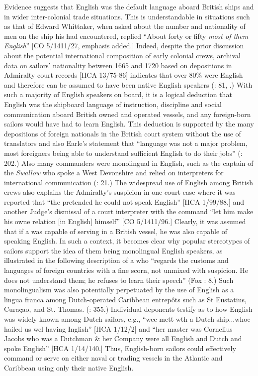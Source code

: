   Evidence suggests that English was the default language aboard British ships and in wider inter-colonial trade situations. This is understandable in situations such as that of Edward Whittaker, when asked about the number and nationality of men on the ship his  had encountered, replied “About forty or fifty \textit{most of them English}” [CO 5/1411/27, emphasis added.] Indeed, despite the prior discussion about the potential international composition of early colonial crews, archival data on sailors’ nationality between 1665 and 1720 based on depositions in Admiralty court records [HCA 13/75-86] indicates that over 80\% were English and therefore can be assumed to have been native English speakers (\citealt{Earle1993}: 81, .) With such a majority of English speakers on board, it is a logical deduction that English was the shipboard language of instruction, discipline and social communication aboard British owned and operated vessels, and any foreign-born sailors would have had to learn English. This deduction is supported by the many depositions of foreign nationals in the British court system without the use of translators and also Earle’s statement that “language was not a major problem, most foreigners being able to understand sufficient English to do their jobs” (\citeyear*{Earle1998}: 202.) Also many commanders were monolingual in English, such as the captain of the \textit{Swallow} who spoke a West Devonshire  and relied on interpreters for international communication (\citealt{Earle1998}: 21.) The widespread use of English among British crews also explains the Admiralty’s suspicion in one court case where it was reported that “the  pretended he could not speak English” [HCA 1/99/88,] and another Judge’s dismissal of a court interpreter with the command “let him make his owne relation [in English] himself” [CO 5/1411/96.] Clearly, it was assumed that if a  was capable of serving in a British vessel, he was also capable of speaking English.  In such a context, it becomes clear why popular stereotypes of sailors support the idea of them being monolingual English speakers, as illustrated in the following description of a  who “regards the customs and languages of foreign countries with a fine scorn, not unmixed with suspicion. He does not understand them; he refuses to learn their speech” (Fox \citealt{Smith1924}: 8.) Such monolingualism was also potentially perpetuated by the use of English as a lingua franca among Dutch-operated Caribbean entrepôts such as St Eustatius, Curaçao, and St. Thomas. (\citealt{Jarvis2010}: 355.) Individual deponents testify as to how English was widely known among Dutch sailors, e.g., “wee mett wth a Dutch ship...whoe hailed us wel having Inglish” [HCA 1/12/2] and “her master was Cornelius Jacobs who was a Dutchman \& her Company were all English and Dutch and spoke English” [HCA 1/14/140.] Thus, English-born sailors could effectively command or serve on either naval or trading vessels in the Atlantic and Caribbean using only their native English. 

